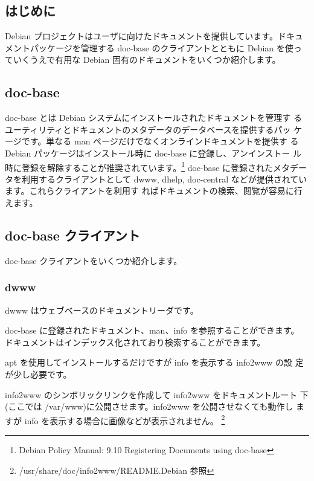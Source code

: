 \documentclass[mingoth,a4paper]{jsarticle}
\begin{document}
\clearpage

\subsection{はじめに}
Debian プロジェクトはユーザに向けたドキュメントを提供しています。ドキュ
メントパッケージを管理する doc-base のクライアントとともに Debian を使っ
ていくうえで有用な Debian 固有のドキュメントをいくつか紹介します。


\subsection{doc-base}
doc-base とは Debian システムにインストールされたドキュメントを管理す
るユーティリティとドキュメントのメタデータのデータベースを提供するパッ
ケージです。単なる man ページだけでなくオンラインドキュメントを提供す
る Debian パッケージはインストール時に doc-base に登録し、アンインストー
ル時に登録を解除することが推奨されています。\footnote{Debian Policy
 Manual: 9.10 Registering Documents using doc-base}
doc-base に登録されたメタデータを利用するクライアントとして dwww,
dhelp, doc-central などが提供されています。これらクライアントを利用す
ればドキュメントの検索、閲覧が容易に行えます。

\subsection{doc-base クライアント}
doc-base クライアントをいくつか紹介します。


\subsubsection{dwww}
dwww はウェブベースのドキュメントリーダです。

doc-base に登録されたドキュメント、man、info を参照することができます。
ドキュメントはインデックス化されており検索することができます。


apt を使用してインストールするだけですが info を表示する info2www の設
定が少し必要です。

info2www のシンボリックリンクを作成して info2www をドキュメントルート
下(ここでは /var/www)に公開させます。info2www を公開させなくても動作し
ますが info を表示する場合に画像などが表示されません。
\footnote{/usr/share/doc/info2www/README.Debian 参照}
\end{document}
